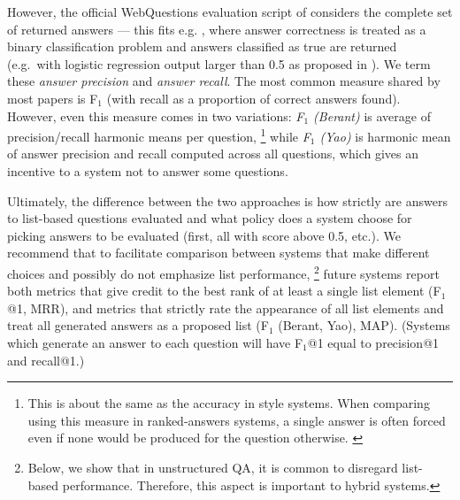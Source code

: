 However, the official WebQuestions evaluation script
of \citep{Semantic2013Berant} considers the complete set
of returned answers --- this fits e.g. \citep{TreeFreebase2014Yao},
where answer correctness is treated as a binary classification problem
and answers classified as true are returned (e.g.\ with logistic regression
output larger than 0.5 as proposed in \cite{FreebaseQA2014Yao}).
We term these \textit{answer precision} and \textit{answer recall}.
The most common measure shared by most papers is F$_1$
(with recall as a proportion of correct answers found).
However, even this measure comes in two variations:
\textit{F$_1$ (Berant)} is average of precision/recall harmonic means per question,%
\footnote{This is about the same as the accuracy in \cite{Semantic2013Berant} style systems.
When comparing using this measure in ranked-answers systems,
a single answer is often forced even if none would be produced for the question otherwise. \citep{FreebaseQA2014Yao}}
while \textit{F$_1$ (Yao)} is harmonic mean of answer precision and recall computed across all questions,
which gives an incentive to a system not to answer some questions.

Ultimately, the difference between the two approaches is how strictly are answers
to list-based questions evaluated and what policy does a system choose for
picking answers to be evaluated (first, all with score above 0.5, etc.).
We recommend that to facilitate comparison between systems that make different choices
and possibly do not emphasize list performance,%
\footnote{Below, we show that in unstructured QA, it is common to disregard list-based performance.
Therefore, this aspect is important to hybrid systems.}
future systems report both metrics that give credit to the best rank of at least
a single list element (F$_1$@1, MRR), and metrics that strictly rate the appearance
of all list elements and treat all generated answers as a proposed list (F$_1$ (Berant, Yao), MAP).
(Systems which generate an answer to each question will have F$_1$@1 equal
to precision@1 and recall@1.)


